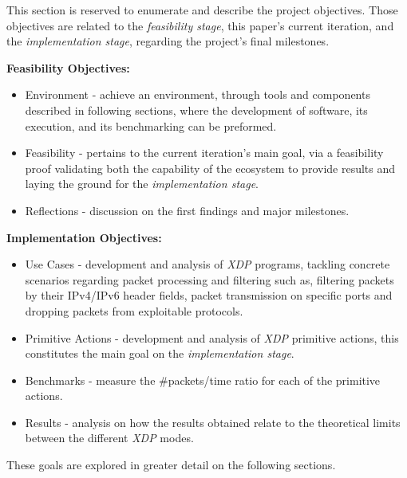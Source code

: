 This section is reserved to enumerate and describe the project objectives.
Those objectives are related to the \textit{feasibility stage}, this paper's current iteration, and the \textit{implementation stage}, regarding the project's final milestones.

\noindent \textbf{Feasibility Objectives:}
\begin{itemize}
    \item Environment - achieve an environment, through tools and components described in following sections, where the development of software, its execution, and its benchmarking can be preformed.
    \item Feasibility - pertains to the current iteration's main goal, via a feasibility proof validating both the capability of the ecosystem to provide results and laying the ground for the \textit{implementation stage}.
    \item Reflections - discussion on the first findings and major milestones.
\end{itemize}

\noindent \textbf{Implementation Objectives:}
\begin{itemize}
    \item Use Cases - development and analysis of \textit{XDP} programs, tackling concrete scenarios  regarding packet processing and filtering such as, filtering packets by their IPv4/IPv6 header fields, packet transmission on specific ports and dropping packets from exploitable protocols.
    \item Primitive Actions - development and analysis of \textit{XDP} primitive actions, this constitutes the main goal on the \textit{implementation stage}.
    \item Benchmarks - measure the \#packets/time ratio for each of the primitive actions.
    \item Results - analysis on how the results obtained relate to the theoretical limits between the different \textit{XDP} modes. 
\end{itemize}

These goals are explored in greater detail on the following sections.


